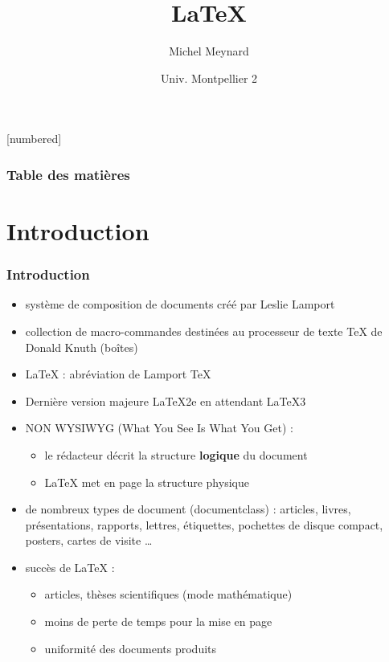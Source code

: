 
\usepackage[francais]{babel}
\usepackage[T1]{fontenc}
\usepackage[utf8]{inputenc}     %
\usepackage{verbatim}           %

\graphicspath{{Figures/}}
[numbered] %


\title{\LaTeX{}}
\author{Michel Meynard }
\date{Univ. Montpellier 2}


\begin{frame}
  \titlepage
\end{frame}

\begin{frame}
  \frametitle{Table des matières}
  {\small \tableofcontents[hideallsubsections]}
\end{frame}


\section{Introduction}

\begin{frame}
\frametitle{Introduction}
\begin{itemize}
\item système de composition de documents créé par Leslie Lamport
\item collection de macro-commandes destinées au processeur de texte \TeX{} de
  Donald Knuth (boîtes)
\item \LaTeX{} : abréviation de Lamport TeX
\item Dernière version majeure \LaTeX2e{} en attendant \LaTeX3{}
\item NON WYSIWYG (What You See Is What You Get) :
  \begin{itemize}
  \item le rédacteur décrit la structure \textbf{logique} du document
  \item \LaTeX{} met en page la structure physique
  \end{itemize}
\item de nombreux types de document (documentclass) : articles, livres,
  présentations, rapports, lettres, étiquettes, pochettes de disque compact,
  posters, cartes de visite \ldots
\item succès de \LaTeX{} :
  \begin{itemize}
  \item articles, thèses scientifiques (mode mathématique)
  \item moins de perte de temps pour la mise en page
  \item uniformité des documents produits
  \end{itemize}
\end{itemize}

\end{frame}


